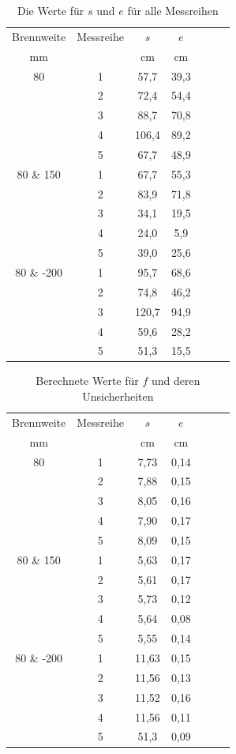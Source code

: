 \documentclass[11pt,a4paper]{article}
\begin{document}
\begin{table}[h]
	\centering
	\begin{tabular*}{0.50\textwidth}{@{\extracolsep{\fill}}cc|ccccc}
		\toprule
		Brennweite & Messreihe & $s$ & $e$   \\
		mm &  & cm & cm  \\
		\bottomrule
		80 & 1 & 57,7 & 39,3 \\
		& 2 & 72,4 & 54,4 \\
		& 3 & 88,7 & 70,8 \\
		& 4 & 106,4 & 89,2 \\
		& 5 & 67,7 & 48,9 \\
		80 \& 150 & 1 & 67,7 & 55,3 \\
		& 2 & 83,9 & 71,8 \\
		& 3 & 34,1 & 19,5 \\
		& 4 & 24,0 & 5,9 \\
		& 5 & 39,0 & 25,6 \\
		80 \& -200 & 1 & 95,7 & 68,6 \\
		& 2 & 74,8 & 46,2 \\
		& 3 & 120,7 & 94,9 \\
		& 4 & 59,6 & 28,2 \\
		& 5 & 51,3 & 15,5 \\
		\bottomrule
	\end{tabular*}
	\caption{Die Werte für $s$ und $e$ für alle Messreihen}
\end{table}


\begin{table}[h]
	\centering
	\begin{tabular*}{0.50\textwidth}{@{\extracolsep{\fill}}cc|ccccc}
		\toprule
		Brennweite & Messreihe & $s$ & $e$   \\
		mm &  & cm & cm  \\
		\bottomrule
		80 & 1 & 7,73 & 0,14 \\
		& 2 & 7,88 & 0,15 \\
		& 3 & 8,05 & 0,16 \\
		& 4 & 7,90 & 0,17 \\
		& 5 & 8,09 & 0,15 \\
		80 \& 150 & 1 & 5,63 & 0,17 \\
		& 2 & 5,61 & 0,17 \\
		& 3 & 5,73 & 0,12 \\
		& 4 & 5,64 & 0,08 \\
		& 5 & 5,55 & 0,14 \\
		80 \& -200 & 1 & 11,63 &0,15 \\
		& 2 & 11,56 & 0,13 \\
		& 3 & 11,52 & 0,16 \\
		& 4 & 11,56 & 0,11 \\
		& 5 & 51,3 & 0,09 \\
		\bottomrule
	\end{tabular*}
	\caption{Berechnete Werte für $f$ und deren Unsicherheiten}
\end{table}
\end{document}
